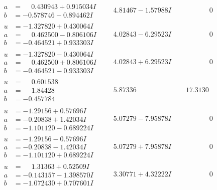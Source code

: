 \documentclass[1p]{elsarticle_modified}
\theoremstyle{definition}
\begin{document}
$$\begin{array}{c|c|c}
\begin{aligned}
a &= \phantom{-}0.430943 + 0.915034 I \\
b &= -0.578746 - 0.894462 I\end{aligned}
 & \phantom{-}4.81467 - 1.57988 I & \phantom{-0.000000 } 0 \\ \hline\begin{aligned}
u &= -1.327820 + 0.430064 I \\
a &= \phantom{-}0.462500 - 0.806106 I \\
b &= -0.464521 + 0.933303 I\end{aligned}
 & \phantom{-}4.02843 - 6.29523 I & \phantom{-0.000000 } 0 \\ \hline\begin{aligned}
u &= -1.327820 - 0.430064 I \\
a &= \phantom{-}0.462500 + 0.806106 I \\
b &= -0.464521 - 0.933303 I\end{aligned}
 & \phantom{-}4.02843 + 6.29523 I & \phantom{-0.000000 } 0 \\ \hline\begin{aligned}
u &= \phantom{-}0.601538\phantom{ +0.000000I} \\
a &= \phantom{-}1.84428\phantom{ +0.000000I} \\
b &= -0.457784\phantom{ +0.000000I}\end{aligned}
 & \phantom{-}5.87336\phantom{ +0.000000I} & \phantom{-}17.3130\phantom{ +0.000000I} \\ \hline\begin{aligned}
u &= -1.29156 + 0.57696 I \\
a &= -0.20838 + 1.42034 I \\
b &= -1.101120 - 0.689224 I\end{aligned}
 & \phantom{-}5.07279 - 7.95878 I & \phantom{-0.000000 } 0 \\ \hline\begin{aligned}
u &= -1.29156 - 0.57696 I \\
a &= -0.20838 - 1.42034 I \\
b &= -1.101120 + 0.689224 I\end{aligned}
 & \phantom{-}5.07279 + 7.95878 I & \phantom{-0.000000 } 0 \\ \hline\begin{aligned}
u &= \phantom{-}1.31363 + 0.52509 I \\
a &= -0.143157 - 1.398570 I \\
b &= -1.072430 + 0.707601 I\end{aligned}
 & \phantom{-}3.30771 + 4.32222 I & \phantom{-0.000000 } 0 \\ \hline\begin{aligned}

\end{aligned}
\end{array}$$
\end{document}
